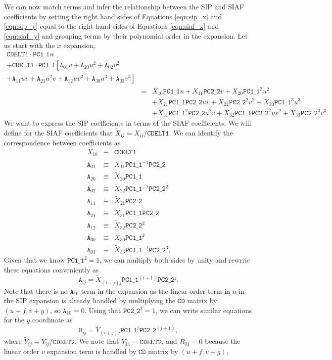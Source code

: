\documentclass[10pt]{article}
\newcommand{\sipA}[2]{\ensuremath{\mathtt{A}_{#1 #2}}}
\newcommand{\sipB}[2]{\ensuremath{\mathtt{B}_{#1 #2}}}
\newcommand{\NCu}{\ensuremath{\mathtt{PC1\_1}}}
\newcommand{\NCv}{\ensuremath{\mathtt{PC2\_2}}}
\begin{document}
We can now match terms and infer the relationship between the SIP and SIAF coefficients by
setting the right hand sides of Equations \ref{eqn:sip_x} and \ref{eqn:sip_y} equal to the
right hand sides of Equations \ref{eqn:siaf_x} and \ref{eqn:siaf_y} and grouping terms by
their polynomial order in the expansion. Let us start with the $x$ expansion,
\begin{eqnarray}
\label{eqn:long_x}
\mathtt{CDELT1} \cdot  \NCu u  &&\\
+ \mathtt{CDELT1} \cdot  \NCu \left[  \sipA{0}{1}v + \sipA{2}{0}u^2 + \sipA{0}{2}v^2 \right.&& \nonumber\\
\left. + \sipA{1}{1}uv + \sipA{2}{1}u^2 v + \sipA{1}{2}uv^2 + \sipA{3}{0}u^3 + \sipA{0}{3}v^3\right] \nonumber&&\\ 
&=& X_{10} \NCu u + X_{11} \NCv v + X_{20} \NCu^2 u^2 \nonumber\\
  &&+ X_{21}\NCu \NCv uv + X_{22} \NCv^2 v^2 + X_{30} \NCu^3 u^3 \nonumber \\
  && + X_{31}\NCu^2 \NCv u^2 v + X_{32} \NCu \NCv^2 u v^2  + X_{33} \NCv^3 v^3\nonumber.
\end{eqnarray}
\noindent
We want to express the SIP coefficients in terms of the
SIAF coefficients.  We will define for the SIAF
coefficients that $\tilde{X}_{ij} = X_{ij}/\mathtt{CDELT1}$.
We can identify the correspondence between coefficients as
\begin{eqnarray}
\label{eqn:matched_x}
X_{10} &\equiv& \mathtt{CDELT1} \\
\sipA{0}{1} &\equiv& \tilde{X}_{11} \NCu^{-1} \NCv \\
\sipA{2}{0} &\equiv& \tilde{X}_{20} \NCu \\
\sipA{0}{2} &\equiv& \tilde{X}_{22} \NCu^{-1} \NCv^{2} \\
\sipA{1}{1} &\equiv& \tilde{X}_{21} \NCv \\
\sipA{2}{1} &\equiv& \tilde{X}_{31} \NCu \NCv \\
\sipA{1}{2} &\equiv& \tilde{X}_{32} \NCv^{2} \\
\sipA{3}{0} &\equiv& \tilde{X}_{30} \NCu^{2} \\
\sipA{0}{3} &\equiv& \tilde{X}_{33} \NCu^{-1} \NCv^{3}.
\end{eqnarray}
\noindent
Given that we know $\NCu^2 = 1$, we can multiply both sides by unity and rewrite these
equations conveniently as
\begin{equation}
\label{eqn:siaf_to_sip_x}
\sipA{i}{j} = \tilde{X}_{(i+j) j} \NCu^{(i+1)} \NCv^j.
\end{equation}
\noindent
Note that there is no $\sipA{1}{0}$ term in the expansion
as the linear order term in $u$ in the SIP expansion is
already handled by multiplying the $\mathtt{CD}$ matrix
by $(u +f, v + g)$, so $\sipA{1}{0} = 0$. Using that
$\NCv^2 = 1$, 
we can write similar equations for the $y$ coordinate as
\begin{equation}
\label{eqn:siaf_to_sip_y}
\sipB{i}{j} = \tilde{Y}_{(i+j) j} \NCu^{i}\NCv^{(j+1)},
\end{equation}
\noindent
where $\tilde{Y}_{ij} \equiv Y_{ij}/\mathtt{CDELT2}$.
We note that $Y_{11} = \mathtt{CDELT2}$, and
$B_{01} = 0$ because the linear order $v$ expansion
term is handled by $\mathtt{CD}$ matrix
by $(u +f, v + g)$.
\end{document}
